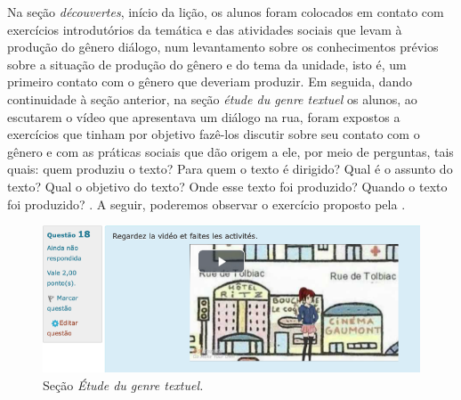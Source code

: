 Na seção \emph{découvertes}, início da lição, os alunos foram colocados
em contato com exercícios introdutórios da temática e das atividades
sociais que levam à produção do gênero diálogo, num levantamento sobre
os conhecimentos prévios sobre a situação de produção do gênero e do
tema da unidade, isto é, um primeiro contato com o gênero que deveriam
produzir. Em seguida, dando continuidade à seção anterior, na seção
\emph{étude du genre textuel} os alunos, ao escutarem o vídeo que
apresentava um diálogo na rua, foram expostos a exercícios que tinham
por objetivo fazê-los discutir sobre seu contato com o gênero e com as
práticas sociais que dão origem a ele, por meio de perguntas, tais
quais: quem produziu o texto? Para quem o texto é dirigido? Qual é o
assunto do texto? Qual o objetivo do texto? Onde esse texto foi
produzido? Quando o texto foi produzido? \cite{stutz_construcao_2011}. A
seguir, poderemos observar o exercício proposto pela .


\begin{figure}[!htbp]
	\centering
	\begin{minipage}{.8\textwidth}
		\includegraphics[width=\textwidth]{imagem1.png}
		\caption{Seção \textit{Étude du genre textuel.}}
		\label{fig-1}
	\end{minipage}
\end{figure}


